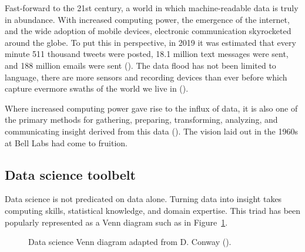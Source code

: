 \documentclass[
  letterpaper,
  krantz1]{latex/krantz-mod}
\theoremstyle{definition}
\theoremstyle{definition}
\theoremstyle{remark}
\begin{document}
Fast-forward to the 21st century, a world in which machine-readable data
is truly in abundance. With increased computing power, the emergence of
the internet, and the wide adoption of mobile devices, electronic
communication skyrocketed around the globe. To put this in perspective,
in 2019 it was estimated that every minute 511 thousand tweets were
posted, 18.1 million text messages were sent, and 188 million emails
were sent (). The data flood has not been limited to language, there
are more sensors and recording devices than ever before which capture
evermore swaths of the world we live in
().

Where increased computing power gave rise to the influx of data, it is
also one of the primary methods for gathering, preparing, transforming,
analyzing, and communicating insight derived from this data
(). The vision laid out in the
1960s at Bell Labs had come to fruition.

\subsection{Data science toolbelt}\label{data-science-toolbelt}

Data science is not predicated on data alone.
Turning data into insight takes computing skills, statistical knowledge,
and domain expertise. This triad has been popularly represented as a
Venn diagram such as in Figure~\ref{fig-intro-data-science-venn}.

\begin{figure}[t]


\caption{\label{fig-intro-data-science-venn}Data science Venn diagram
adapted from D. Conway ().}

\end{figure}%
\end{document}
